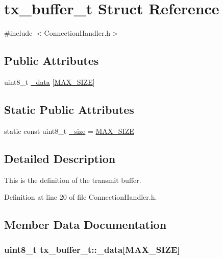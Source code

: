 \hypertarget{structtx__buffer__t}{\section{tx\-\_\-buffer\-\_\-t \-Struct \-Reference}
\label{structtx__buffer__t}
}


{\ttfamily \#include $<$\-Connection\-Handler.\-h$>$}

\subsection*{\-Public \-Attributes}
\begin{DoxyCompactItemize}
\item 
uint8\-\_\-t \hyperlink{structtx__buffer__t_af187921bea8ad001b9de80b17e8f3b85}{\-\_\-data} \mbox{[}\hyperlink{_data_processor_8h_a0592dba56693fad79136250c11e5a7fe}{\-M\-A\-X\-\_\-\-S\-I\-Z\-E}\mbox{]}
\end{DoxyCompactItemize}
\subsection*{\-Static \-Public \-Attributes}
\begin{DoxyCompactItemize}
\item 
static const uint8\-\_\-t \hyperlink{structtx__buffer__t_a9e50e47b9d21ef81014e8325acc2bb3f}{\-\_\-size} = \hyperlink{_data_processor_8h_a0592dba56693fad79136250c11e5a7fe}{\-M\-A\-X\-\_\-\-S\-I\-Z\-E}
\end{DoxyCompactItemize}


\subsection{\-Detailed \-Description}
\-This is the definition of the transmit buffer. 

\-Definition at line 20 of file \-Connection\-Handler.\-h.



\subsection{\-Member \-Data \-Documentation}
\hypertarget{structtx__buffer__t_af187921bea8ad001b9de80b17e8f3b85}{
\subsubsection[{\-\_\-data}]{\setlength{\rightskip}{0pt plus 5cm}uint8\-\_\-t {\bf tx\-\_\-buffer\-\_\-t\-::\-\_\-data}\mbox{[}{\bf \-M\-A\-X\-\_\-\-S\-I\-Z\-E}\mbox{]}}}\label{structtx__buffer__t_af187921bea8ad001b9de80b17e8f3b85}


